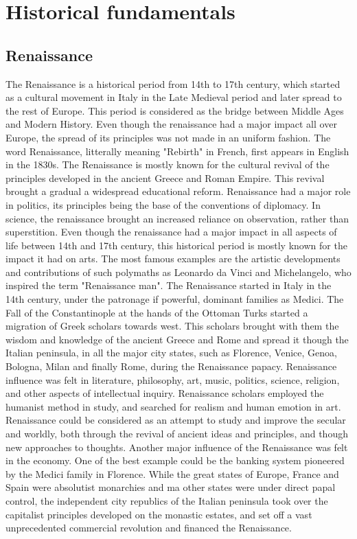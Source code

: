 
\section{Historical fundamentals}


\subsection{Renaissance}

The Renaissance is a historical period from 14th to 17th century, which started as a cultural movement in Italy in the Late Medieval period and later spread to the rest of Europe. This period is considered as the bridge between Middle Ages and Modern History. Even though the renaissance had a major impact all over Europe, the spread of its principles was not made in an uniform fashion. The word Renaissance, litterally meaning "Rebirth" in French, first appears in English in the 1830s.
The Renaissance is mostly known for the cultural revival of the principles developed in the ancient Greece and Roman Empire. This revival brought a gradual a widespread educational reform.
Renaissance had a major role  in politics, its principles being the base of the conventions of diplomacy. In science, the renaissance brought an increased reliance on observation, rather than superstition.
Even though the renaissance had a major impact in all aspects of life between 14th and 17th century, this historical period is mostly known for the impact it had on arts. The most famous examples are the artistic developments and contributions of such polymaths as Leonardo da Vinci and Michelangelo, who inspired the term "Renaissance man".
The Renaissance started in Italy in the 14th century, under the patronage if powerful, dominant families as Medici. The Fall of the Constantinople at the hands of the Ottoman Turks started a migration of Greek scholars towards west. This scholars brought with them the wisdom and knowledge of the ancient Greece and Rome and spread it though the Italian peninsula, in all the major city states, such as Florence, Venice, Genoa, Bologna, Milan and finally Rome, during the Renaissance papacy.
Renaissance influence was felt in literature, philosophy, art, music, politics, science, religion, and other aspects of intellectual inquiry. Renaissance scholars employed the humanist method in study, and searched for realism and human emotion in art.
Renaissance could be considered as an attempt to study and improve the secular and worldly, both through the revival of ancient ideas and principles, and though new approaches to thoughts.
Another major influence of the Renaissance was felt in the economy. One of the best example could be the banking system pioneered by the Medici family in Florence. While the great states of Europe, France and Spain were absolutist monarchies and ma other states were under direct papal control, the independent city republics of the Italian peninsula took over the capitalist principles developed on the monastic estates, and set off a vast unprecedented commercial revolution and financed the Renaissance.

